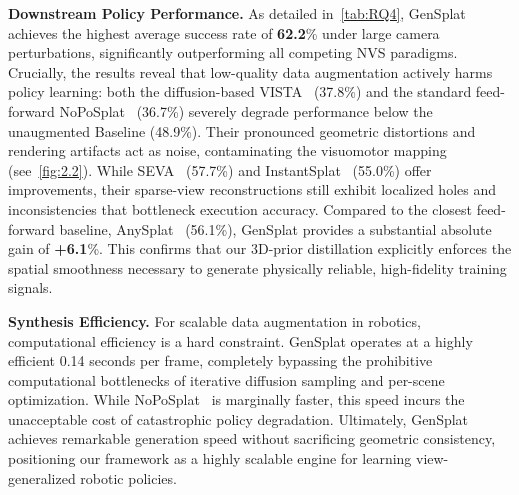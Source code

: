 



\noindent \textbf{Downstream Policy Performance.} 
As detailed in~\cref{tab:RQ4}, GenSplat achieves the highest average success rate of \textbf{62.2}\% under large camera perturbations, significantly outperforming all competing NVS paradigms. Crucially, the results reveal that low-quality data augmentation actively harms policy learning: both the diffusion-based VISTA~\cite{tian2024view} (37.8\%) and the standard feed-forward NoPoSplat~\cite{ye2024no} (36.7\%) severely degrade performance below the unaugmented Baseline (48.9\%). Their pronounced geometric distortions and rendering artifacts act as noise, contaminating the visuomotor mapping (see~\cref{fig:2.2}). While SEVA~\cite{zhou2025stable} (57.7\%) and InstantSplat~\cite{fan2024instantsplat} (55.0\%) offer improvements, their sparse-view reconstructions still exhibit localized holes and inconsistencies that bottleneck execution accuracy. Compared to the closest feed-forward baseline, AnySplat~\cite{jiang2025anysplat} (56.1\%), GenSplat provides a substantial absolute gain of \textbf{+6.1}\%. This confirms that our 3D-prior distillation explicitly enforces the spatial smoothness necessary to generate physically reliable, high-fidelity training signals.

\noindent \textbf{Synthesis Efficiency.} 
For scalable data augmentation in robotics, computational efficiency is a hard constraint. GenSplat operates at a highly efficient 0.14 seconds per frame, completely bypassing the prohibitive computational bottlenecks of iterative diffusion sampling and per-scene optimization. While NoPoSplat~\cite{ye2024no} is marginally faster, this speed incurs the unacceptable cost of catastrophic policy degradation. 
Ultimately, GenSplat achieves remarkable generation speed without sacrificing geometric consistency, positioning our framework as a highly scalable engine for learning view-generalized robotic policies.


